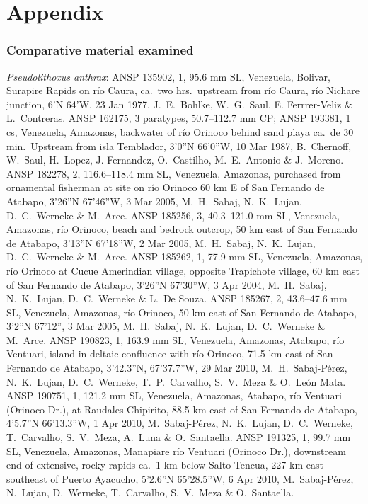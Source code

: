 \documentclass[12pt]{article}
\begin{document}
\section*{Appendix}
\subsubsection*{Comparative material examined}

\noindent \emph{Pseudolithoxus anthrax}: ANSP 135902, 1, 95.6 mm SL, Venezuela, Bolivar, Surapire Rapids on río Caura, ca.\ two hrs.\ upstream from río Caura, río Nichare junction, 6’N 64’W, 23 Jan 1977, J.\ E.\ Bohlke, W.\ G.\ Saul, E. Ferrrer-Veliz \& L.\ Contreras. %
ANSP 162175, 3 paratypes, 50.7--112.7 mm CP; ANSP 193381, 1 cs, Venezuela, Amazonas, backwater of río Orinoco behind sand playa ca.\ de 30 min.\ Upstream from isla Temblador, 3’0”N 66’0”W, 10 Mar 1987, B.\ Chernoff, W.\ Saul, H.\ Lopez, J. Fernandez, O.\ Castilho, M.\ E.\ Antonio \& J.\ Moreno. %
ANSP 182278, 2, 116.6--118.4 mm SL, Venezuela, Amazonas, purchased from ornamental fisherman at site on río Orinoco 60 km E of San Fernando de Atabapo, 3’26”N 67’46”W, 3 Mar 2005, M.\ H.\ Sabaj, N.\ K.\ Lujan, D.\ C.\ Werneke \& M.\ Arce. %
ANSP 185256, 3, 40.3--121.0 mm SL, Venezuela, Amazonas, río Orinoco, beach and bedrock outcrop, 50 km east of San Fernando de Atabapo, 3’13”N 67’18”W, 2 Mar 2005, M.\ H.\ Sabaj, N.\ K.\ Lujan, D.\ C.\ Werneke \& M.\ Arce. %
ANSP 185262, 1, 77.9 mm SL, Venezuela, Amazonas, río Orinoco at Cucue Amerindian village, opposite Trapichote village, 60 km east of San Fernando de Atabapo, 3’26”N 67’30”W, 3 Apr 2004, M.\ H.\ Sabaj, N.\ K.\ Lujan, D.\ C.\ Werneke \& L.\ De Souza. %
ANSP 185267, 2, 43.6--47.6 mm SL, Venezuela, Amazonas, río Orinoco, 50 km east of San Fernando de Atabapo, 3’2”N 67’12”, 3 Mar 2005, M.\ H.\ Sabaj, N.\ K.\ Lujan, D.\ C.\ Werneke \& M.\ Arce. %
ANSP 190823, 1, 163.9 mm SL, Venezuela, Amazonas, Atabapo, río Ventuari, island in deltaic confluence with río Orinoco, 71.5 km east of San Fernando de Atabapo, 3’42.3”N, 67’37.7”W, 29 Mar 2010, M.\ H.\ Sabaj-Pérez, N.\ K.\ Lujan, D.\ C.\ Werneke, T.\ P.\ Carvalho, S.\ V.\ Meza \& O.\ León Mata. %
ANSP 190751, 1, 121.2 mm SL, Venezuela, Amazonas, Atabapo, río Ventuari (Orinoco Dr.), at Raudales Chipirito, 88.5 km east of San Fernando de Atabapo, 4’5.7”N 66’13.3”W, 1 Apr 2010, M.\ Sabaj-Pérez, N.\ K.\ Lujan, D.\ C.\ Werneke, T.\ Carvalho, S.\ V.\ Meza, A.\ Luna \& O.\ Santaella. %
ANSP 191325, 1, 99.7 mm SL, Venezuela, Amazonas, Manapiare río Ventuari (Orinoco Dr.), downstream end of extensive, rocky rapids ca.\ 1 km below Salto Tencua, 227 km east-southeast of Puerto Ayacucho, 5’2.6”N 65’28.5”W, 6 Apr 2010, M.\ Sabaj-Pérez, N.\ Lujan, D.\ Werneke, T.\ Carvalho, S.\ V.\ Meza \& O.\ Santaella.\\%
\bigskip
\end{document}
